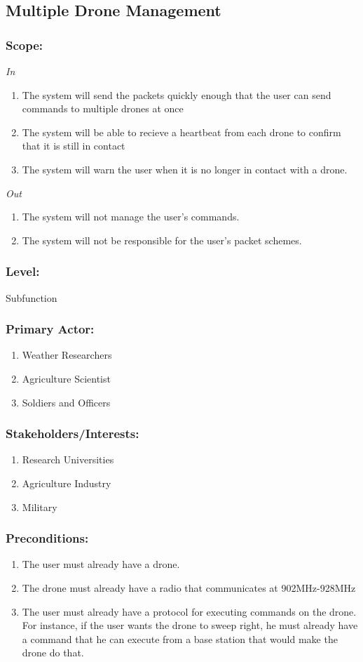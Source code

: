 \documentclass[ProductRequirements.tex]{subfiles}
\begin{document}
	
	\subsection{Multiple Drone Management}
	\subsubsection*{Scope:}
	\textit{In}
	\begin{enumerate}
		\item The system will send the packets quickly enough that the user can send commands to multiple drones at once
		\item The system will be able to recieve a heartbeat from each drone to confirm that it is still in contact
		\item The system will warn the user when it is no longer in contact with a drone.
	\end{enumerate}
	\textit{Out}
	\begin{enumerate}
		\item The system will not manage the user's commands.
		\item The system will not be responsible for the user's packet schemes.
	\end{enumerate}
	\subsubsection*{Level:}
	Subfunction
	\subsubsection*{Primary Actor:}
	\begin{enumerate}
		\item Weather Researchers
		\item Agriculture Scientist
		\item Soldiers and Officers
	\end{enumerate}
	\subsubsection*{Stakeholders/Interests:}
	\begin{enumerate}\itemsep1pt
		\item Research Universities
		\item Agriculture Industry
		\item Military
	\end{enumerate}
	\subsubsection*{Preconditions:}
	\begin{enumerate}\itemsep1pt
		\item The user must already have a drone.
		\item The drone must already have a radio that communicates at 902MHz-928MHz
		\item The user must already have a protocol for executing commands on the drone. For instance, if the user wants the drone to sweep right, he must already have a command that he can execute from a base station that would make the drone do that.
	\end{enumerate}
\end{document}
